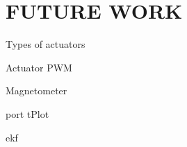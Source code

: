 \chapter{FUTURE WORK}
\label{chap:FutureWork}


Types of actuators

Actuator PWM

Magnetometer

port tPlot

ekf

